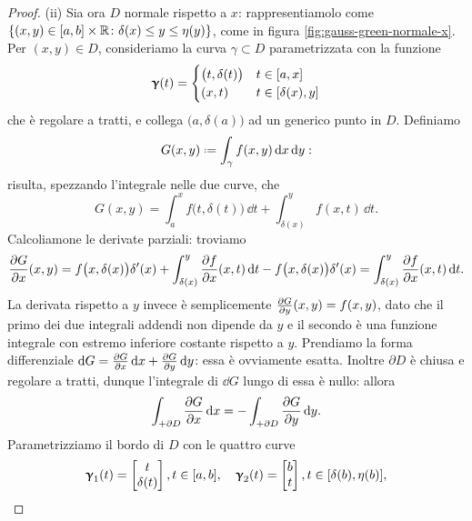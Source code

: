 \begin{proof}
	
	(ii) Sia ora $D$ normale rispetto a $x$: rappresentiamolo come $\{(x,y)\in[a,b]\times\mathbb{R}\colon\delta(x)\leq y\leq\eta(y)\}$, come in figura \ref{fig:gauss-green-normale-x}.
	Per $(x,y)\in D$, consideriamo la curva $\gamma\subset D$ parametrizzata con la funzione
	\begin{equation*}
		\bm{\upgamma}(t)=
		\begin{cases}
			\big(t,\delta(t)\big) &t\in[a,x]\\
			(x,t) &t\in[\delta(x),y]
		\end{cases}
	\end{equation*}
	che è regolare a tratti, e collega $\big(a,\delta(a)\big)$ ad un generico punto in $D$.
	Definiamo
	\begin{equation*}
		G(x,y)\defeq\int_{\gamma}f(x,y)\,\dd x\,\dd y:
	\end{equation*}
	risulta, spezzando l'integrale nelle due curve, che
	\begin{equation}
		G(x,y)=\int_a^xf\big(t,\delta(t)\big)\,\dd t+\int_{\delta(x)}^yf(x,t)\,\dd t.
	\end{equation}
	Calcoliamone le derivate parziali: troviamo
	\begin{equation}
		\frac{\partial {G}}{\partial {x}}(x,y)=f\big(x,\delta(x)\big)\delta'(x)+\int_{\delta(x)}^y\frac{\partial {f}}{\partial {x}}(x,t)\,\textup{d} t-f\big(x,\delta(x)\big)\delta'(x)=\int_{\delta(x)}^y\frac{\partial {f}}{\partial {x}}(x,t)\,\textup{d} t.
	\end{equation}
	La derivata rispetto a $y$ invece è semplicemente $\frac{\partial {G}}{\partial {y}}(x,y)=f(x,y)$, dato che il primo dei due integrali addendi non dipende da $y$ e il secondo è una funzione integrale con estremo inferiore costante rispetto a $y$.
	Prendiamo la forma differenziale $\textup{d} G=\frac{\partial {G}}{\partial {x}}\,\textup{d} x+\frac{\partial {G}}{\partial {y}}\,\textup{d} y$: essa è ovviamente esatta.
	Inoltre $\partial D$ è chiusa e regolare a tratti, dunque l'integrale di $\dd G$ lungo di essa è nullo: allora
	\begin{equation}
		\int_{+\partial D}\frac{\partial {G}}{\partial {x}}\,\textup{d} x=-\int_{+\partial D}\frac{\partial {G}}{\partial {y}}\,\textup{d} y.
		\label{eq:dim-gauss-green-forma-esatta}
	\end{equation}
	Parametrizziamo il bordo di $D$ con le quattro curve
	\begin{gather*}
		\vgamma_1(t)=
		\begin{bmatrix}
			t\\\delta(t)
		\end{bmatrix}, t\in[a,b],\quad
		\vgamma_2(t)=
		\begin{bmatrix}
			b\\t
		\end{bmatrix}, t\in[\delta(b),\eta(b)],\\

\end{gather*}
\end{proof}
